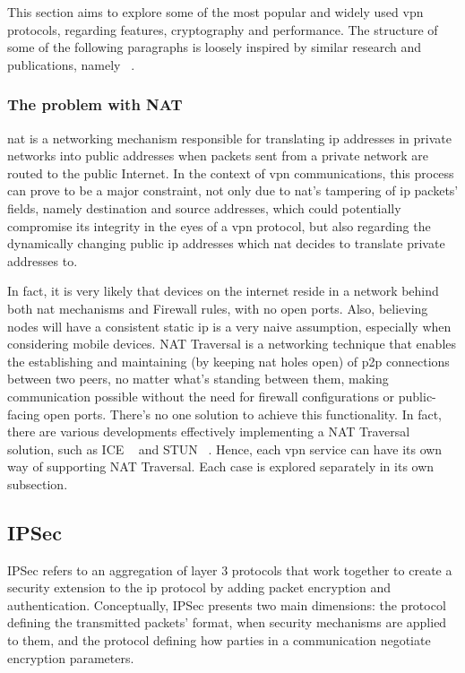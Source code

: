 \documentclass[11pt,twoside,a4paper]{report}
\begin{document}
This section aims to explore some of the most popular and widely used \ac{vpn} protocols, regarding features, cryptography and performance. The structure of some of the following paragraphs is loosely inspired by similar research and publications, namely ~\cite{zuqueteseguranca}.

\subsubsection{The problem with NAT}

\ac{nat} is a networking mechanism responsible for translating \ac{ip} addresses in private networks into public addresses when packets sent from a private network are routed to the public Internet. In the context of \ac{vpn} communications, this process can prove to be a major constraint, not only due to \ac{nat}'s tampering of \ac{ip} packets' fields, namely destination and source addresses, which could potentially compromise its integrity in the eyes of a \ac{vpn} protocol, but also regarding the dynamically changing public \ac{ip} addresses which \ac{nat} decides to translate private addresses to.

In fact, it is very likely that devices on the internet reside in a network behind both \ac{nat} mechanisms and Firewall rules, with no open ports. Also, believing nodes will have a consistent static \ac{ip} is a very naive assumption, especially when considering mobile devices. NAT Traversal is a networking technique that enables the establishing and maintaining (by keeping \ac{nat} holes open) of \ac{p2p} connections between two peers, no matter what's standing between them, making communication possible without the need for firewall configurations or public-facing open ports. There's no one solution to achieve this functionality. In fact, there are various developments effectively implementing a NAT Traversal solution, such as ICE ~\cite{rfc8445} and STUN ~\cite{rfc8489}. Hence, each \ac{vpn} service can have its own way of supporting NAT Traversal. Each case is explored separately in its own subsection.

\subsection{IPSec}

IPSec refers to an aggregation of layer 3 protocols that work together to create a security extension to the \ac{ip} protocol by adding packet encryption and authentication. Conceptually, IPSec presents two main dimensions: the protocol defining the transmitted packets' format, when security mechanisms are applied to them, and the protocol defining how parties in a communication negotiate encryption parameters.
\end{document}
